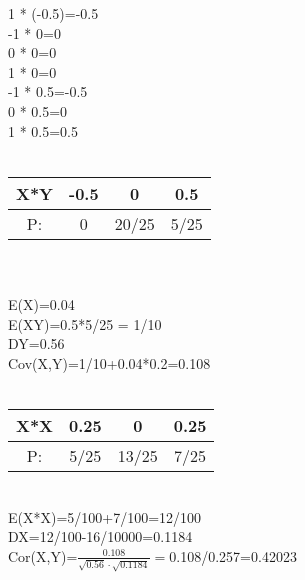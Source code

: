 \documentclass[12pt]{article}
\begin{document}
1 * (-0.5)=-0.5\\
-1 * 0=0\\
0 * 0=0\\
1 * 0=0\\
-1 * 0.5=-0.5\\
0 * 0.5=0\\
1 * 0.5=0.5\\
\\
\begin{tabular}{|c|c|c|c|}
\hline
X*Y & -0.5 & 0 & 0.5 \\
\hline
P: & 0 & 20/25 & 5/25  \\
\hline
\end{tabular}
\\
\\
E(X)=0.04\\
E(XY)=0.5*5/25 = 1/10\\
DY=0.56\\
Cov(X,Y)=1/10+0.04*0.2=0.108\\
\\
\begin{tabular}{|c|c|c|c|}
\hline
X*X & 0.25 & 0 & 0.25 \\
\hline
P: & 5/25 & 13/25 & 7/25  \\
\hline
\end{tabular}
\\
E(X*X)=5/100+7/100=12/100\\
DX=12/100-16/10000=0.1184\\
Cor(X,Y)=$\frac{0.108}{\sqrt{0.56} \cdot \sqrt{0.1184}}=$0.108/0.257=0.42023\\
\newpage
\end{document}
